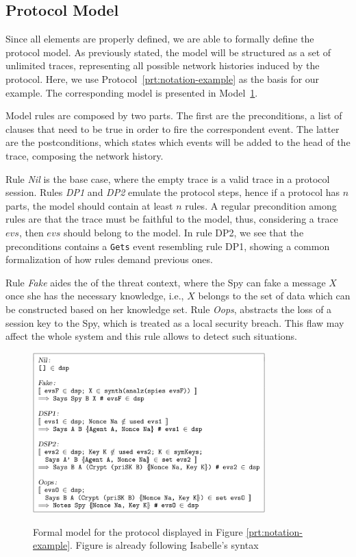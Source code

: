 \subsection{Protocol Model}
Since all elements are properly defined, we are able to formally define the protocol model. As previously stated, the model will be structured as a set of unlimited traces, representing all possible network histories induced by the protocol. Here, we use Protocol~\ref{prt:notation-example} as the basis for our example. The corresponding model is presented in Model~\ref{fig:notation-example-model}.

Model rules are composed by two parts. The first are the preconditions, a list of clauses that need to be true in order to fire the correspondent event. The latter are the postconditions, which states which events will be added to the head of the trace, composing the network history.

Rule \textit{Nil} is the base case, where the empty trace is a valid trace in a protocol session. Rules \textit{DP1} and \textit{DP2} emulate the protocol steps, hence if a protocol has $n$ parts, the model should contain at least $n$ rules. A regular precondition among rules are that the trace must be faithful to the model, thus, considering a trace $evs$, then $evs$ should belong to the model. In rule DP2, we see that the preconditions contains a \texttt{Gets} event resembling rule DP1, showing a common formalization of how rules demand previous ones.

Rule \textit{Fake} aides the of the threat context, where the Spy can fake a message $X$ once she has the necessary knowledge, i.e., $X$ belongs to the set of data which can be constructed based on her knowledge set. Rule \textit{Oops}, abstracts the loss of a session key to the Spy, which is treated as a local security breach. This flaw may affect the whole system and this rule allows to detect such situations.

\begin{figure}
  \centering
  \includegraphics[width=0.8\textwidth]{img/prt-example-model}
  \label{fig:notation-example-model}
  \caption{Formal model for the protocol displayed in Figure \ref{prt:notation-example}. Figure is already following Isabelle's syntax}
\end{figure}

